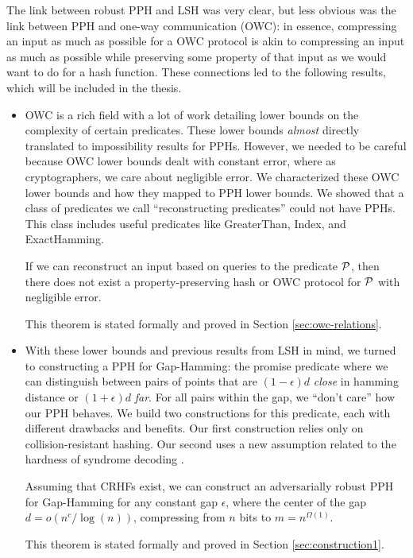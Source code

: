 The link between robust PPH and LSH was very clear, but less obvious was the link between PPH and one-way communication (OWC): in essence, compressing an input as much as possible for a OWC protocol is akin to compressing an input as much as possible while preserving some property of that input as we would want to do for a hash function. These connections led to the following results, which will be included in the thesis.
\begin{itemize}
	\item OWC is a rich field with a lot of work detailing lower bounds on the complexity of certain predicates. These lower bounds \emph{almost} directly translated to impossibility results for PPHs. However, we needed to be careful because OWC lower bounds dealt with constant error, where as cryptographers, we care about negligible error. We characterized these OWC lower bounds and how they mapped to PPH lower bounds. We showed that a class of predicates we call ``reconstructing predicates'' could not have PPHs. This class includes useful predicates like GreaterThan, Index, and ExactHamming.
	\begin{theorem*}
		If we can reconstruct an input based on queries to the predicate ${\cal P}$, then there does not exist a property-preserving hash or OWC protocol for ${\cal P}$ with negligible error.
	\end{theorem*}
	This theorem is stated formally and proved in Section \ref{sec:owc-relations}.
	\item With these lower bounds and previous results from LSH in mind, we turned to constructing a PPH for Gap-Hamming: the promise predicate where we can distinguish between pairs of points that are $(1-\epsilon)d$ \emph{close} in hamming distance or $(1 + \epsilon)d$ \emph{far}. For all pairs within the gap, we ``don't care'' how our PPH behaves. We build two constructions for this predicate, each with different drawbacks and benefits. Our first construction relies only on collision-resistant hashing. Our second uses a new assumption related to the hardness of syndrome decoding \cite{AHIKV17}.
	\begin{theorem*}
		Assuming that CRHFs exist, we can construct an adversarially robust PPH for Gap-Hamming for any constant gap $\epsilon$, where the center of the gap $d = o(n^c/\log(n))$, compressing from $n$ bits to $m = n^{\Omega(1)}$.
	\end{theorem*}
	This theorem is stated formally and proved in Section \ref{sec:construction1}.


\end{itemize}
